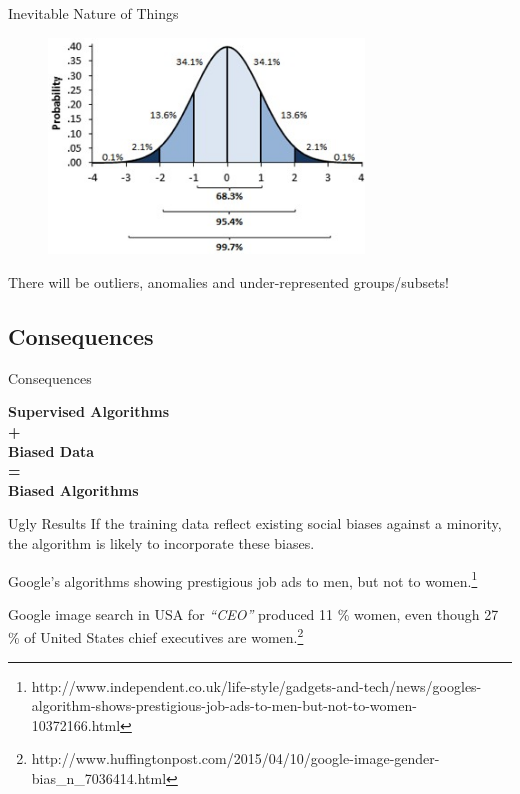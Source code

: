 \documentclass{beamer}
\begin{document}
\begin{frame}{Inevitable Nature of Things}
		\begin{figure}
	  		\vspace*{-0.1cm}
			\centering
			\includegraphics[trim = 0mm 10mm 0mm 0mm, clip, width=8.4cm]{normal.jpg}
			\label{fig:res4}
		\end{figure}
\begin{center}
There will be outliers, anomalies and under-represented groups/subsets!
\end{center}
\end{frame}

\subsection{Consequences}
\begin{frame}{Consequences}
\begin{center}
\textbf{\LARGE{
Supervised Algorithms \\ \pause + \\  Biased Data \\ \pause = \\ \vspace{0.4cm} Biased Algorithms}}
\end{center}
\end{frame}

\begin{frame}{Ugly Results}
If the training data reflect existing social biases against a minority, the algorithm is likely to incorporate these biases. \pause
\begin{block}{ }
Google's algorithms showing prestigious job ads to men, but not to women.\footnote{http://www.independent.co.uk/life-style/gadgets-and-tech/news/googles-algorithm-shows-prestigious-job-ads-to-men-but-not-to-women-10372166.html}
\end{block} \pause
\begin{block}{ }
Google image search in USA for \textit{``CEO''} produced 11 \% women, even though 27 \% of United States chief executives are women.\footnote{http://www.huffingtonpost.com/2015/04/10/google-image-gender-bias\_n\_7036414.html}
\end{block}
\end{frame}
\end{document}
